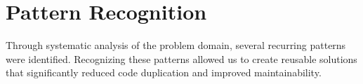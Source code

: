 

\section{Pattern Recognition}
Through systematic analysis of the problem domain, several recurring patterns were identified. Recognizing these patterns allowed us to create reusable solutions that significantly reduced code duplication and improved maintainability.

